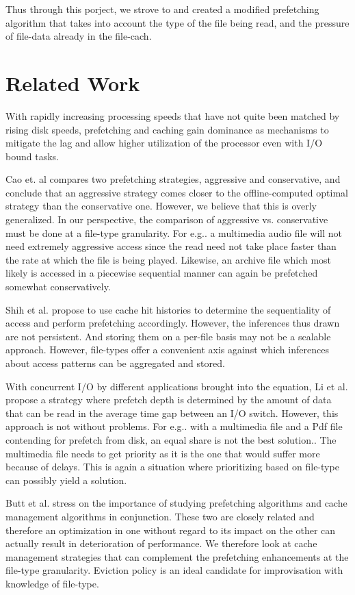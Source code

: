 \documentclass[twocolumn,10pt]{article}
\begin{document}
Thus through this porject, we strove to and created a modified prefetching
algorithm that takes into account the type of the file being read, and the pressure of file-data already in the file-cach.

\section{Related Work}
With rapidly increasing processing speeds that have not quite
been matched by rising disk speeds, prefetching and caching 
gain dominance as mechanisms to mitigate the lag and allow 
higher utilization of the processor even with I/O bound tasks.

Cao et. al \cite{1} compares two prefetching strategies, aggressive and conservative,
and conclude that an aggressive strategy comes closer to the offline-computed
optimal strategy than the conservative one. However, we believe that this
is overly generalized. In our perspective, the comparison of aggressive vs.
conservative must be done at a file-type granularity. For e.g.. a multimedia
audio file will not need extremely aggressive access since the read need
not take place faster than the rate at which the file is being played.
Likewise, an archive file which most likely is accessed in a piecewise
sequential manner can again be prefetched somewhat conservatively.

Shih et al. \cite{6} propose to use cache hit histories to determine the
sequentiality of access and perform prefetching accordingly. However,
the inferences thus drawn are not persistent. And storing them on a
per-file basis may not be a scalable approach. However, file-types
offer a convenient axis against which inferences about access
patterns can be aggregated and stored.

With concurrent I/O by different applications brought into the equation,
Li et al. \cite{2} propose a strategy where prefetch depth is determined by
the amount of data that can be read in the average time gap between
an I/O switch. However, this approach is not without problems. For e.g..
with a multimedia file and a Pdf file contending for prefetch from
disk, an equal share is not the best solution.. The multimedia file
needs to get priority as it is the one that would suffer more because
of delays. This is again a situation where prioritizing based on
file-type can possibly yield a solution.

Butt et al. \cite{7} stress on the importance of studying prefetching algorithms
and cache management algorithms in conjunction. These two are closely related
and therefore an optimization in one without regard to its impact on the
other can actually result in deterioration of performance. We therefore
look at cache management strategies that can complement the prefetching
enhancements at the file-type granularity. Eviction policy is an ideal
candidate for improvisation with knowledge of file-type.
\end{document}
